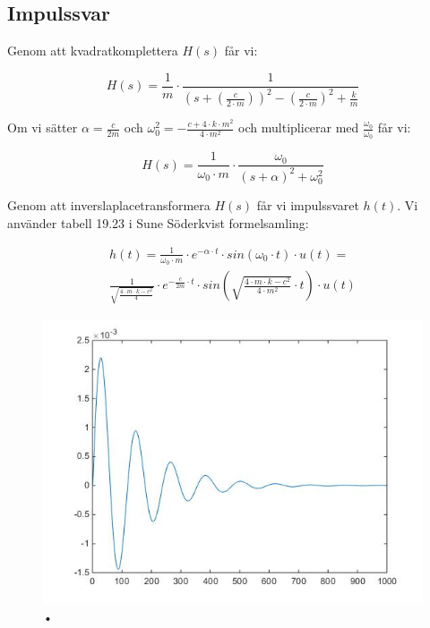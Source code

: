 \documentclass[10pt,a4paper]{article}
\begin{document}
\newpage
\subsection{Impulssvar}

Genom att kvadratkomplettera $H(s)$ får vi:

\begin{equation}
H(s) = \frac{1}{m} \cdot \frac{1}{(s+(\frac{c}{2 \cdot m}))^2-(\frac{c}{2 \cdot m})^2+\frac{k}{m}} 
\end{equation}

Om vi sätter $\alpha = \frac{c}{2m}$ och $\omega_0^2 = {-\frac{c + 4\cdot k \cdot m^2}{4 \cdot m^2}}$ och multiplicerar med $\frac{\omega_0}{\omega_0}$ får vi:

\begin{equation}
H(s) = \frac{1}{\omega_0 \cdot m} \cdot \frac{\omega_0}{(s + \alpha)^2 +\omega_0^2}
\end{equation}

Genom att inverslaplacetransformera $H(s)$ får vi impulssvaret $h(t)$. Vi använder tabell 19.23 i Sune Söderkvist formelsamling:

\begin{multline}
h(t) = \frac{1}{\omega_0 \cdot m} \cdot e^{-\alpha \cdot t} \cdot sin(\omega_0 \cdot t) \cdot u(t) = \\ \frac{1}{\sqrt{\frac{4 \cdot m \cdot k - c^2}{4}} }  \cdot e^{-\frac{c}{2m} \cdot t} \cdot sin(\sqrt{\frac{4 \cdot m \cdot k - c^2}{4 \cdot m^2}} \cdot t) \cdot u(t)
\end{multline}

\begin{figure}[h]
\begin{center}

\includegraphics[scale=0.5]{Impulssvar}
\caption{•}
\end{center}
\end{figure}
\end{document}
